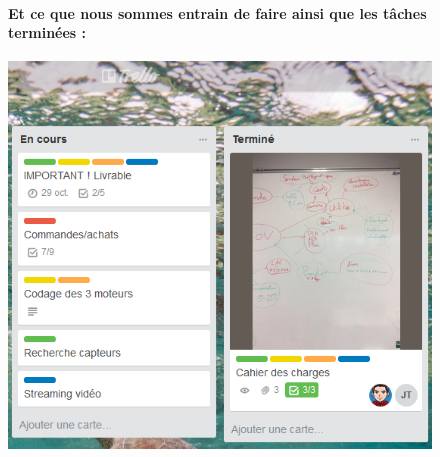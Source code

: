 \documentclass[a4paper,11pt]{report}
\begin{document}
						\begin{figure}[!h]
							\paragraph{\newline Et ce que nous sommes entrain de faire ainsi que les tâches terminées : \newline}
							\begin{center}
								\includegraphics[scale=0.5]{Illustrations/Planning2.png}
							\end{center}
						\end{figure}
						
\end{document}
